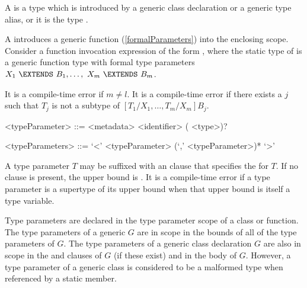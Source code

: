 \documentclass[makeidx]{article}
\begin{document}
\LMHash{}%
A  is a type which is introduced by
a generic class declaration or a generic type alias,
or it is the type .

\LMHash{}%
A 
introduces a generic function (\ref{formalParameters}) into the enclosing scope.
Consider a function invocation expression of the form
,
where the static type of  is a generic function type with formal type parameters
$X_1\ \EXTENDS\ B_1, \ldots,\ X_m\ \EXTENDS\ B_m$.

\LMHash{}%
It is a compile-time error if $m \not= l$.
It is a compile-time error if there exists a $j$
such that $T_j$ is not a subtype of $[T_1/X_1, \ldots, T_m/X_m]B_j$.


\begin{grammar}
<typeParameter> ::= <metadata> <identifier> (\EXTENDS{} <type>)?

<typeParameters> ::= `<' <typeParameter> (`,' <typeParameter>)* `>'
\end{grammar}

\LMHash{}%
A type parameter $T$ may be suffixed with an \EXTENDS{} clause that specifies the  for $T$.
If no \EXTENDS{} clause is present, the upper bound is .
It is a compile-time error if a type parameter is a supertype of its upper bound
when that upper bound is itself a type variable.


\LMHash{}%
Type parameters are declared in the type parameter scope of a class or function.
The type parameters of a generic $G$ are in scope in the bounds of all of the type parameters of $G$.
The type parameters of a generic class declaration $G$ are also in scope in the \EXTENDS{} and \IMPLEMENTS{} clauses of $G$ (if these exist) and in the body of $G$.
However, a type parameter of a generic class is considered to be a malformed type when referenced by a static member.

\end{document}
